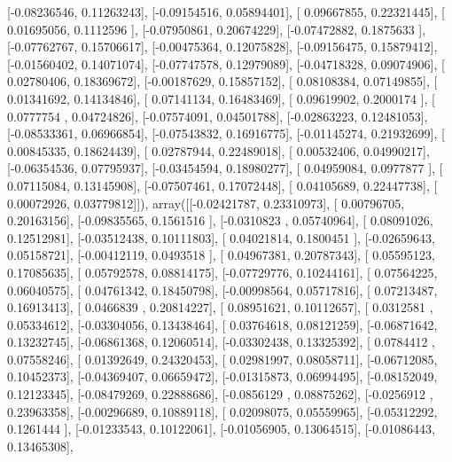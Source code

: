 \documentclass{article}
\begin{document}
       [-0.08236546,  0.11263243],
       [-0.09154516,  0.05894401],
       [ 0.09667855,  0.22321445],
       [ 0.01695056,  0.1112596 ],
       [-0.07950861,  0.20674229],
       [-0.07472882,  0.1875633 ],
       [-0.07762767,  0.15706617],
       [-0.00475364,  0.12075828],
       [-0.09156475,  0.15879412],
       [-0.01560402,  0.14071074],
       [-0.07747578,  0.12979089],
       [-0.04718328,  0.09074906],
       [ 0.02780406,  0.18369672],
       [-0.00187629,  0.15857152],
       [ 0.08108384,  0.07149855],
       [ 0.01341692,  0.14134846],
       [ 0.07141134,  0.16483469],
       [ 0.09619902,  0.2000174 ],
       [ 0.0777754 ,  0.04724826],
       [-0.07574091,  0.04501788],
       [-0.02863223,  0.12481053],
       [-0.08533361,  0.06966854],
       [-0.07543832,  0.16916775],
       [-0.01145274,  0.21932699],
       [ 0.00845335,  0.18624439],
       [ 0.02787944,  0.22489018],
       [ 0.00532406,  0.04990217],
       [-0.06354536,  0.07795937],
       [-0.03454594,  0.18980277],
       [ 0.04959084,  0.0977877 ],
       [ 0.07115084,  0.13145908],
       [-0.07507461,  0.17072448],
       [ 0.04105689,  0.22447738],
       [ 0.00072926,  0.03779812]]), array([[-0.02421787,  0.23310973],
       [ 0.00796705,  0.20163156],
       [-0.09835565,  0.1561516 ],
       [-0.0310823 ,  0.05740964],
       [ 0.08091026,  0.12512981],
       [-0.03512438,  0.10111803],
       [ 0.04021814,  0.1800451 ],
       [-0.02659643,  0.05158721],
       [-0.00412119,  0.0493518 ],
       [ 0.04967381,  0.20787343],
       [ 0.05595123,  0.17085635],
       [ 0.05792578,  0.08814175],
       [-0.07729776,  0.10244161],
       [ 0.07564225,  0.06040575],
       [ 0.04761342,  0.18450798],
       [-0.00998564,  0.05717816],
       [ 0.07213487,  0.16913413],
       [ 0.0466839 ,  0.20814227],
       [ 0.08951621,  0.10112657],
       [ 0.0312581 ,  0.05334612],
       [-0.03304056,  0.13438464],
       [ 0.03764618,  0.08121259],
       [-0.06871642,  0.13232745],
       [-0.06861368,  0.12060514],
       [-0.03302438,  0.13325392],
       [ 0.0784412 ,  0.07558246],
       [ 0.01392649,  0.24320453],
       [ 0.02981997,  0.08058711],
       [-0.06712085,  0.10452373],
       [-0.04369407,  0.06659472],
       [-0.01315873,  0.06994495],
       [-0.08152049,  0.12123345],
       [-0.08479269,  0.22888686],
       [-0.0856129 ,  0.08875262],
       [-0.0256912 ,  0.23963358],
       [-0.00296689,  0.10889118],
       [ 0.02098075,  0.05559965],
       [-0.05312292,  0.1261444 ],
       [-0.01233543,  0.10122061],
       [-0.01056905,  0.13064515],
       [-0.01086443,  0.13465308],
\end{document}
